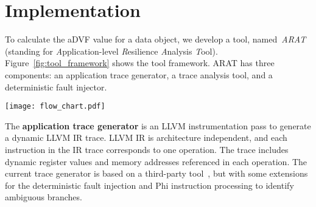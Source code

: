 \section{Implementation}
\label{sec:impl}

To calculate the aDVF value for a data object, %
we develop a tool, named~\textit{ARAT} (standing for \textit{A}pplication-level \textit{R}esilience \textit{A}nalysis \textit{T}ool). 
Figure~\ref{fig:tool_framework} shows the tool framework.
ARAT has three components: an application trace generator, a trace analysis tool, and a deterministic fault injector.


\begin{figure*}
  \begin{center}
  \texttt{[image: flow\_chart.pdf]}
  \vspace{-5pt}
  \caption{ARAT, a tool for application-level resilience modeling based on the aDVF analysis}
  \label{fig:tool_framework}
  \end{center}
  \vspace{-15pt}
\end{figure*}

The \textbf{application trace generator} is an LLVM instrumentation pass to generate a dynamic LLVM IR trace.
LLVM IR is architecture independent, and each instruction in the IR trace corresponds to one operation.
The trace includes dynamic register values and memory addresses referenced in each operation.
The current trace generator is based on a third-party tool~\cite{ispass13:shao}, but with some extensions 
for the deterministic fault injection %
and Phi instruction processing to identify ambiguous branches.

